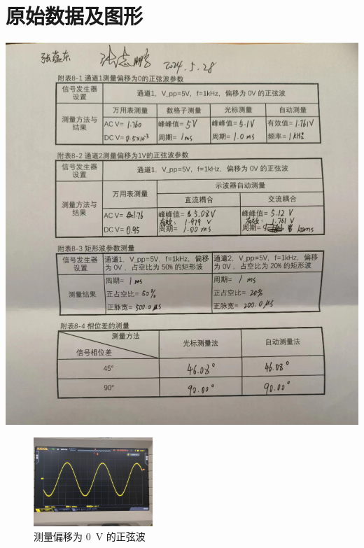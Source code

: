 \documentclass[a4paper,utf8]{article}
\begin{document}
    \section{原始数据及图形}
    \begin{center}
        \includegraphics[height=0.95\textwidth]{0.jpg}
    \end{center}
    \newpage
    \clearpage
    \begin{figure}[!ht]
        \includegraphics[width=0.4\textwidth]{1.jpg}
        \caption{测量偏移为 \SI{0}{\V} 的正弦波\label{fig:8.1}}
    \end{figure}\par
\end{document}
